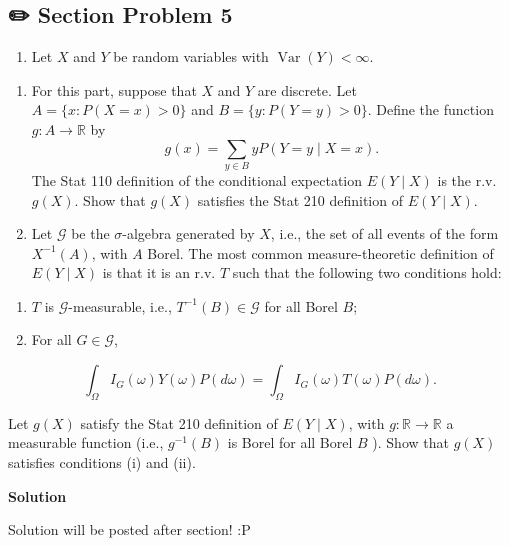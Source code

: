 \documentclass[
  letterpaper,
  DIV=11,
  numbers=noendperiod]{scrreprt}
\providecommand{\tightlist}{%
  \setlength{\itemsep}{0pt}\setlength{\parskip}{0pt}}\usepackage{longtable,booktabs,array}
\theoremstyle{plain}
\theoremstyle{definition}
\theoremstyle{remark}
\begin{document}
\hypertarget{section-problem-5-4}{%
\subsection*{✏️ Section Problem 5}\label{section-problem-5-4}}

\begin{enumerate}
\def\labelenumi{\arabic{enumi}.}
\setcounter{enumi}{2}
\tightlist
\item
  Let \(X\) and \(Y\) be random variables with
  \(\operatorname{Var}(Y)<\infty\).
\end{enumerate}

\begin{enumerate}
\def\labelenumi{(\alph{enumi})}
\item
  For this part, suppose that \(X\) and \(Y\) are discrete. Let
  \(A=\{x: P(X=x)>0\}\) and \(B=\{y: P(Y=y)>0\}\). Define the function
  \(g: A \rightarrow \mathbb{R}\) by \[
  g(x)=\sum_{y \in B} y P(Y=y \mid X=x) .
  \] The Stat 110 definition of the conditional expectation
  \(E(Y \mid X)\) is the r.v. \(g(X)\). Show that \(g(X)\) satisfies the
  Stat 210 definition of \(E(Y \mid X)\).
\item
  Let \(\mathcal{G}\) be the \(\sigma\)-algebra generated by \(X\),
  i.e., the set of all events of the form \(X^{-1}(A)\), with \(A\)
  Borel. The most common measure-theoretic definition of \(E(Y \mid X)\)
  is that it is an r.v. \(T\) such that the following two conditions
  hold:
\end{enumerate}

\begin{enumerate}
\def\labelenumi{\roman{enumi}.}
\item
  \(T\) is \(\mathcal{G}\)-measurable, i.e.,
  \(T^{-1}(B) \in \mathcal{G}\) for all Borel \(B\);
\item
  For all \(G \in \mathcal{G}\),
\end{enumerate}

\[
\int_{\Omega} I_G(\omega) Y(\omega) P(d \omega)=\int_{\Omega} I_G(\omega) T(\omega) P(d \omega) .
\]

Let \(g(X)\) satisfy the Stat 210 definition of \(E(Y \mid X)\), with
\(g: \mathbb{R} \rightarrow \mathbb{R}\) a measurable function (i.e.,
\(g^{-1}(B)\) is Borel for all Borel \(B\) ). Show that \(g(X)\)
satisfies conditions (i) and (ii).

\begin{tcolorbox}[enhanced jigsaw, arc=.35mm, colframe=quarto-callout-tip-color-frame, left=2mm, rightrule=.15mm, bottomrule=.15mm, colback=white, toprule=.15mm, opacityback=0, leftrule=.75mm, breakable]
\begin{minipage}[t]{5.5mm}
\textcolor{quarto-callout-tip-color}{\faLightbulb}
\end{minipage}%
\begin{minipage}[t]{\textwidth - 5.5mm}

\textbf{Solution}\vspace{2mm}

Solution will be posted after section! :P

\end{minipage}%
\end{tcolorbox}
\end{document}
